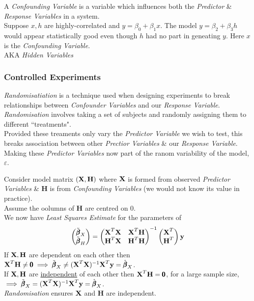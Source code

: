 \documentclass[11pt,a4paper]{article}
\begin{document}
A \textit{Confounding Variable} is a variable which influences both the \textit{Predictor} \& \textit{Response Variables} in a system.\\
Suppose $x,h$ are highly-correlated and $y=\beta_0+\beta_1x$. The model $y=\beta_2+\beta_3h$ would appear statistically good even though $h$ had no part in geneating $y$. Here $x$ is the \textit{Confounding Variable}.\\
\nb AKA \textit{Hidden Variables}

\subsubsection{Controlled Experiments}

\textit{Randomisatiation} is a technique used when designing experiments to break relationships between \textit{Confounder Variables} and our \textit{Response Variable}.\\
\textit{Randomisation} involves taking a set of subjects and randomly assigning them to different ``treatments".\\
Provided these treaments only vary the \textit{Predictor Variable} we wish to test, this breaks association between other \textit{Prectior Variables} \& our \textit{Response Variable}. Making these \textit{Predictor Variables} now part of the ranom variability of the model, $\varepsilon$.\\


Consider model matrix $(\textbf{X},\textbf{H})$ where $\textbf{X}$ is formed from observed \textit{Predictor Variables} \& $\textbf{H}$ is from \textit{Confounding Variables} (\nb we would not know its value in practice).\\
Assume the oolumns of $\textbf{H}$ are centred on 0.\\
We now have \textit{Least Squares Estimate} for the parameters of
$$\begin{pmatrix}\tilde{\pmb\beta}_X\\\tilde{\pmb\beta}_H\end{pmatrix}=\begin{pmatrix}\textbf{X}^T\textbf{X}&\textbf{X}^T\textbf{H}\\\textbf{H}^T\textbf{X}&\textbf{H}^T\textbf{H}\end{pmatrix}^{-1}\begin{pmatrix}\textbf{X}^T\\\textbf{H}^T\end{pmatrix}\textbf{y}$$
If $\textbf{X},\textbf{H}$ are dependent on each other then $\textbf{X}^T\textbf{H}\neq\pmb0\implies\tilde{\pmb\beta}_X\neq(\textbf{X}^T\textbf{X})^{-1}\textbf{X}^T\textbf{y}=\hat{\pmb\beta}_X$.\\
If $\textbf{X},\textbf{H}$ are \underline{independent} of each other then $\textbf{X}^T\textbf{H}=\pmb0$, for a large sample size,\\
$\implies\tilde{\pmb\beta}_X=(\textbf{X}^T\textbf{X})^{-1}\textbf{X}^T\textbf{y}=\hat{\pmb\beta}_X$.\\
\nb \textit{Randomisation} ensures $\textbf{X}$ and $\textbf{H}$ are independent.
\end{document}

